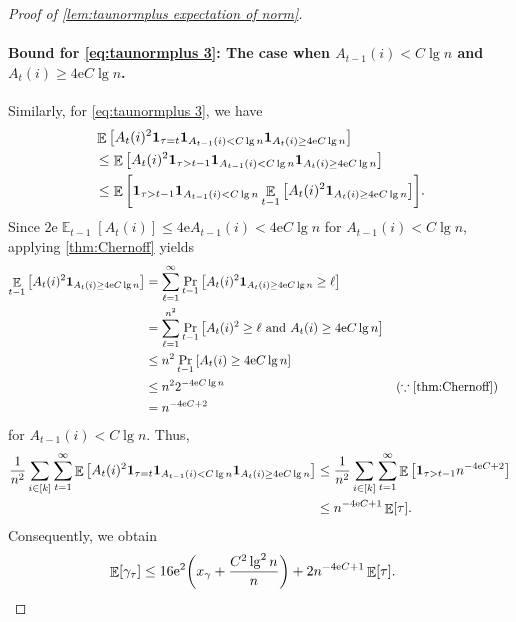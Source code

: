 \documentclass[letterpaper,11pt]{article}
\newcommand{\indicator}{\mathbf{1}}
\DeclareMathOperator*{\E}{\mathbb{E}}
\newcommand{\e}{\mathrm{e}}
\newcommand{\alphanorm}{\gamma}
\newcommand{\xnorm}{x_{\alphanorm}}
\begin{document}
\begin{proof}[Proof of \cref{lem:taunormplus expectation of norm}]
    \paragraph{Bound for \cref{eq:taunormplus 3}: The case when $A_{t-1}(i)< C\lg n$ and $A_{t}(i)\geq 4\e C\lg n$.}
    Similarly, for \cref{eq:taunormplus 3}, we have
    \begin{align*}
        &\E\qty[A_t(i)^2\indicator_{\tau=t}\indicator_{A_{t-1}(i)< C\lg n}\indicator_{A_{t}(i)\geq 4\e C\lg n}] \\
        &\leq \E\qty[A_t(i)^2\indicator_{\tau>t-1}\indicator_{A_{t-1}(i)< C\lg n}\indicator_{A_{t}(i)\geq 4\e C\lg n}] \\
        &\leq \E\qty[\indicator_{\tau>t-1}\indicator_{A_{t-1}(i)< C\lg n}\E_{t-1}\qty[A_t(i)^2\indicator_{A_{t}(i)\geq 4\e C\lg n}]].
    \end{align*}
    Since $2\e\E_{t-1}[A_t(i)]\leq 4\e A_{t-1}(i) <4\e C\lg n$ for $A_{t-1}(i)< C\lg n$, 
    applying \cref{thm:Chernoff} yields
    \begin{align*}
        \E_{t-1}\qty[A_t(i)^2\indicator_{A_{t}(i)\geq 4\e C\lg n}]
        &=\sum_{\ell=1}^{\infty}\Pr_{t-1}\qty[A_t(i)^2\indicator_{A_{t}(i)\geq 4\e C\lg n}\geq \ell]\\
        &=\sum_{\ell=1}^{n^2}\Pr_{t-1}\qty[A_t(i)^2\geq \ell \textrm{ and } A_{t}(i)\geq 4\e C\lg n]\\
        &\leq n^2\Pr_{t-1}\qty[A_{t}(i)\geq 4\e C\lg n]\\
        &\leq n^2 2^{-4\e C\lg n} &&(\because \mathrm{\cref{thm:Chernoff}})\\
        &=n^{-4\e C+2}
    \end{align*}
    for $A_{t-1}(i)< C\lg n$.
    Thus,
    \begin{align*}
        \frac{1}{n^2}\sum_{i\in [k]}\sum_{t=1}^\infty\E\qty[A_t(i)^2\indicator_{\tau=t}\indicator_{A_{t-1}(i)< C\lg n}\indicator_{A_{t}(i)\geq 4\e C\lg n}]
        &\leq \frac{1}{n^2}\sum_{i\in [k]}\sum_{t=1}^\infty\E\qty[\indicator_{\tau>t-1}n^{-4\e C+2}]\\
        &\leq n^{-4\e C+1}\E[\tau].
    \end{align*}
    Consequently, we obtain
    \begin{align*}
        \E[\alphanorm_\tau]
        &\leq 16\e^2\qty(\xnorm+\frac{C^2\lg^2n}{n})+2n^{-4\e C+1}\E[\tau].
    \end{align*}
\end{proof}
\end{document}
